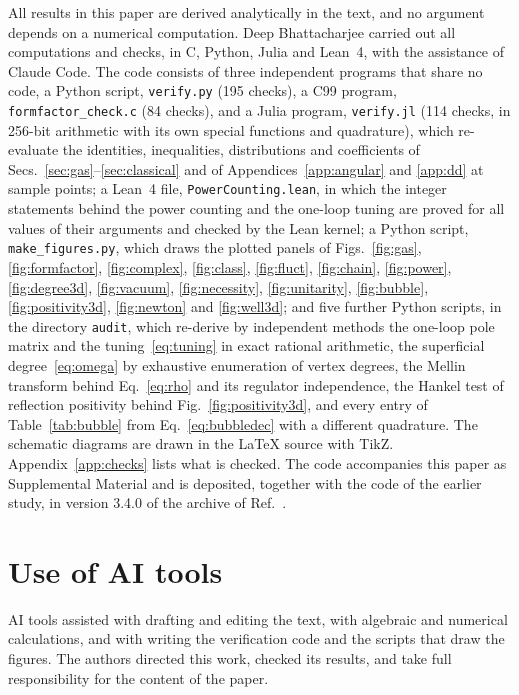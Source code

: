 \documentclass[a4paper,11pt]{article}
\begin{document}
All results in this paper are derived analytically in the text, and no argument depends on a numerical computation. Deep Bhattacharjee carried out all computations and checks, in C, Python, Julia and Lean~4, with the assistance of Claude Code. The code consists of three independent programs that share no code, a Python script, \texttt{verify.py} (195 checks), a C99 program, \texttt{formfactor\_check.c} (84 checks), and a Julia program, \texttt{verify.jl} (114 checks, in 256-bit arithmetic with its own special functions and quadrature), which re-evaluate the identities, inequalities, distributions and coefficients of Secs.~\ref{sec:gas}--\ref{sec:classical} and of Appendices~\ref{app:angular} and \ref{app:dd} at sample points; a Lean~4 file, \texttt{PowerCounting.lean}, in which the integer statements behind the power counting and the one-loop tuning are proved for all values of their arguments and checked by the Lean kernel; a Python script, \texttt{make\_figures.py}, which draws the plotted panels of Figs.~\ref{fig:gas}, \ref{fig:formfactor}, \ref{fig:complex}, \ref{fig:class}, \ref{fig:fluct}, \ref{fig:chain}, \ref{fig:power}, \ref{fig:degree3d}, \ref{fig:vacuum}, \ref{fig:necessity}, \ref{fig:unitarity}, \ref{fig:bubble}, \ref{fig:positivity3d}, \ref{fig:newton} and \ref{fig:well3d}; and five further Python scripts, in the directory \texttt{audit}, which re-derive by independent methods the one-loop pole matrix and the tuning~\eqref{eq:tuning} in exact rational arithmetic, the superficial degree~\eqref{eq:omega} by exhaustive enumeration of vertex degrees, the Mellin transform behind Eq.~\eqref{eq:rho} and its regulator independence, the Hankel test of reflection positivity behind Fig.~\ref{fig:positivity3d}, and every entry of Table~\ref{tab:bubble} from Eq.~\eqref{eq:bubbledec} with a different quadrature. The schematic diagrams are drawn in the \LaTeX{} source with TikZ. Appendix~\ref{app:checks} lists what is checked. The code accompanies this paper as Supplemental Material and is deposited, together with the code of the earlier study, in version 3.4.0 of the archive of Ref.~\cite{Bhattacharjee2026}.

\section*{Use of AI tools}

AI tools assisted with drafting and editing the text, with algebraic and numerical calculations, and with writing the verification code and the scripts that draw the figures. The authors directed this work, checked its results, and take full responsibility for the content of the paper.
\end{document}
